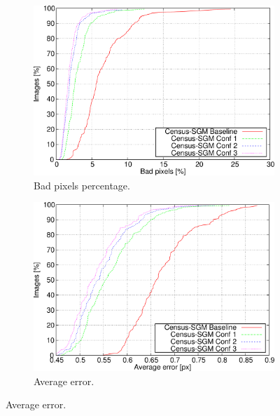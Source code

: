 \begin{figure}
  \centering
  \begin{subfigure}[h]{\textwidth}
    \centering
    \includegraphics[width=\textwidth, trim=0 0 0 0,clip]{comp_bpp}
    \caption{ Bad pixels percentage. }
    \label{fig:cp03_composite_LGT_bpp}
  \end{subfigure}%
  
  \begin{subfigure}[h]{\textwidth}
    \centering
    \includegraphics[width=\textwidth, trim=0 0 0 0,clip]{comp_avg}
    \caption{ Average error. }
    \label{fig:cp03_composite_LGT_avg}
  \end{subfigure}%
\end{figure}

